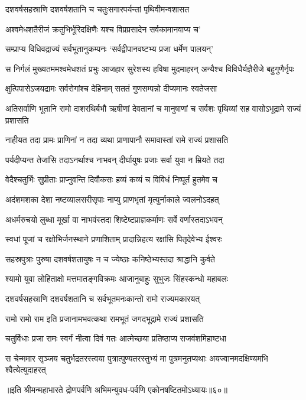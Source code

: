 \twolineshloka
{दशवर्षसहस्राणि दशवर्षशतानि च}
{चतुःसगारपर्यन्तां पृथिवीमन्वशासत}


\twolineshloka
{अश्वमेधशतैरीजं क्रतुभिर्भूरिदक्षिणैः}
{यश्च विप्रप्रसादेन सर्वकामानवाप्य च'}


\twolineshloka
{सम्प्राप्य विधिवद्राज्यं सर्वभूतानुकम्पनः}
{`सर्वद्वीपानवष्टभ्य प्रजा धर्मेण पालयन्'}


\threelineshloka
{स निर्गलं मुख्यतममश्वमेधशतं प्रभुः}
{आजहार सुरेशस्य हविषा मुदमाहरन्}
{अन्यैश्च विविधैर्यज्ञैरीजे बहुगुणैर्नृपः}


\twolineshloka
{क्षुत्पिपासेऽजयद्रामः सर्वरोगांश्च देहिनाम्}
{सततं गुणसम्पन्नो दीप्यमानः स्वतेजसा}


\threelineshloka
{अतिसर्वाणि भूतानि रामो दाशरथिर्बभौ}
{ऋषीणां देवतानां च मानुषाणां च सर्वशः}
{पृथिव्यां सह वासोऽभूद्रामे राज्यं प्रशासति}


\twolineshloka
{नाहीयत तदा प्रामः प्राणिनां न तदा व्यथा}
{प्राणापानौ समावास्तां रामे राज्यं प्रशासति}


\twolineshloka
{पर्यदीप्यन्त तेजांसि तदाऽनर्थाश्च नाभवन्}
{दीर्घायुषः प्रजाः सर्वा युवा न म्रियते तदा}


\twolineshloka
{वेदैश्चतुर्भिः सुप्रीताः प्राप्नुवन्ति दिवौकसः}
{हव्यं कव्यं च विविधं निष्पूर्तं हुतमेव च}


\twolineshloka
{अदंशमशका देशा नष्टव्यालसरीसृपाः}
{नाप्यु प्राणभृतां मृत्युर्नाकाले ज्वलनोऽदहत्}


\twolineshloka
{अधर्मरुचयो लुब्धा मूर्खा वा नाभवंस्तदा}
{शिष्टेष्टप्राज्ञकर्माणः सर्वे वर्णास्तदाऽभवन्}


\twolineshloka
{स्वधां पूजां च रक्षोभिर्जनस्थाने प्रणाशिताम्}
{प्रादान्निहत्य रक्षांसि पितृदेवेभ्य ईश्वरः}


\twolineshloka
{सहस्रपुत्राः पुरुषा दशवर्षशतायुषः}
{न च ज्येष्ठाः कनिष्ठेभ्यस्तदा श्राद्धानि कुर्वते}


\twolineshloka
{श्यामो युवा लोहिताक्षो मत्तमातङ्गविक्रमः}
{आजानुबाहुः सुभुजः सिंहस्कन्धो महाबलः}


\twolineshloka
{दशवर्षसहस्राणि दशवर्षशतानि च}
{सर्वभूतमनःकान्तो रामो राज्यमकारयत्}


\twolineshloka
{रामो रामो राम इति प्रजानामभवत्कथा}
{रामभूतं जगदभूद्रामे राज्यं प्रशासति}


\twolineshloka
{चतुर्विधाः प्रजा रामः स्वर्गं नीत्वा दिवं गतः}
{आत्मेच्छया प्रतिष्ठाप्य राजवंशमिहाष्टधा}


\threelineshloka
{स चेन्ममार सृञ्जय चतुर्भद्रतरस्त्वया}
{पुत्रात्पुण्यतरस्तुभ्यं मा पुत्रमनुतप्यथाः}
{अयज्वानमदक्षिण्यमभि श्वैत्येत्युदाहरत्}


॥इति श्रीमन्महाभारते द्रोणपर्वणि अभिमन्युवध-पर्वणि एकोनषष्टितमोऽध्यायः॥६०॥

\closesection